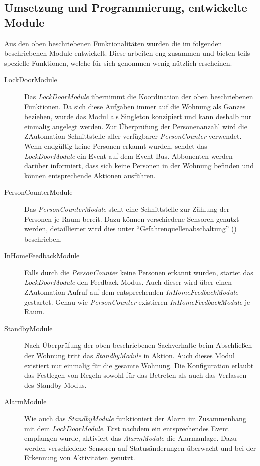 \subsection{Umsetzung und Programmierung, entwickelte Module}
Aus den oben beschriebenen Funktionalitäten wurden die im folgenden beschriebenen Module entwickelt. Diese arbeiten eng zusammen und bieten teils spezielle Funktionen, welche für sich genommen wenig nützlich erscheinen.
\begin{description}
	\item [LockDoorModule] Das \emph{LockDoorModule} übernimmt die Koordination der oben beschriebenen Funktionen. Da sich diese Aufgaben immer auf die Wohnung als Ganzes beziehen, wurde das Modul als Singleton konzipiert und kann deshalb nur einmalig angelegt werden. Zur Überprüfung der Personenanzahl wird die ZAutomation-Schnittstelle aller verfügbarer \emph{PersonCounter} verwendet. Wenn endgültig keine Personen erkannt wurden, sendet das \emph{LockDoorModule} ein Event auf dem Event Bus. Abbonenten werden darüber informiert, dass sich keine Personen in der Wohnung befinden und können entsprechende Aktionen ausführen. 
	
	\item [PersonCounterModule] Das \emph{PersonCounterModule} stellt eine Schnittstelle zur Zählung der Personen je Raum bereit. Dazu können verschiedene Sensoren genutzt werden, detaillierter wird dies unter "`Gefahrenquellenabschaltung"' () beschrieben.
	
	\item [InHomeFeedbackModule] Falls durch die \emph{PersonCounter} keine Personen erkannt wurden, startet das \emph{LockDoorModule} den Feedback-Modus. Auch dieser wird über einen ZAutomation-Aufruf auf dem entsprechenden \emph{InHomeFeedbackModule} gestartet. Genau wie \emph{PersonCounter} existieren \emph{InHomeFeedbackModule} je Raum.
	
	\item [StandbyModule] Nach Überprüfung der oben beschriebenen Sachverhalte beim Abschließen der Wohnung tritt das \emph{StandbyModule} in Aktion. Auch dieses Modul existiert nur einmalig für die gesamte Wohnung. Die Konfiguration erlaubt das Festlegen von Regeln sowohl für das Betreten als auch das Verlassen des Standby-Modus.
	
	\item [AlarmModule] Wie auch das \emph{StandbyModule} funktioniert der Alarm im Zusammenhang mit dem \emph{LockDoorModule}. Erst nachdem ein entsprechendes Event empfangen wurde, aktiviert das \emph{AlarmModule} die Alarmanlage. Dazu werden verschiedene Sensoren auf Statusänderungen überwacht und bei der Erkennung von Aktivitäten genutzt.
\end{description}

